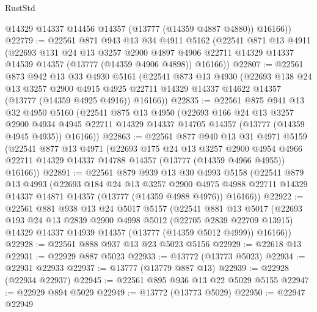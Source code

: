 \begin{lexlean}{RustStd}
\begin{coremodule}
        @14329
        @14337
        @14456
        @14357
        (@13777 (@14359 @4887 @4880))
        @16166))
@22779 := @22561
    @871
    @943
    @13
    @34
    @4911
    @5162
    (@22541
      @871
      @13
      @4911
      (@22693
        @131
        @24
        @13
        @3257
        @2900
        @4897
        @4906
        @22711
        @14329
        @14337
        @14539
        @14357
        (@13777 (@14359 @4906 @4898))
        @16166))
@22807 := @22561
    @873
    @942
    @13
    @33
    @4930
    @5161
    (@22541
      @873
      @13
      @4930
      (@22693
        @138
        @24
        @13
        @3257
        @2900
        @4915
        @4925
        @22711
        @14329
        @14337
        @14622
        @14357
        (@13777 (@14359 @4925 @4916))
        @16166))
@22835 := @22561
    @875
    @941
    @13
    @32
    @4950
    @5160
    (@22541
      @875
      @13
      @4950
      (@22693
        @166
        @24
        @13
        @3257
        @2900
        @4934
        @4945
        @22711
        @14329
        @14337
        @14705
        @14357
        (@13777 (@14359 @4945 @4935))
        @16166))
@22863 := @22561
    @877
    @940
    @13
    @31
    @4971
    @5159
    (@22541
      @877
      @13
      @4971
      (@22693
        @175
        @24
        @13
        @3257
        @2900
        @4954
        @4966
        @22711
        @14329
        @14337
        @14788
        @14357
        (@13777 (@14359 @4966 @4955))
        @16166))
@22891 := @22561
    @879
    @939
    @13
    @30
    @4993
    @5158
    (@22541
      @879
      @13
      @4993
      (@22693
        @184
        @24
        @13
        @3257
        @2900
        @4975
        @4988
        @22711
        @14329
        @14337
        @14871
        @14357
        (@13777 (@14359 @4988 @4976))
        @16166))
@22922 := @22561
    @881
    @938
    @13
    @24
    @5017
    @5157
    (@22541
      @881
      @13
      @5017
      (@22693
        @193
        @24
        @13
        @2839
        @2900
        @4998
        @5012
        (@22705 @2839 @22709 @13915)
        @14329
        @14337
        @14939
        @14357
        (@13777 (@14359 @5012 @4999))
        @16166))
@22928 := @22561 @888 @937 @13 @23 @5023 @5156
@22929 := @22618 @13
@22931 := @22929 @887 @5023
@22933 := @13772 (@13773 @5023)
@22934 := @22931 @22933
@22937 := @13777 (@13779 @887 @13)
@22939 := @22928 (@22934 @22937)
@22945 := @22561 @895 @936 @13 @22 @5029 @5155
@22947 := @22929 @894 @5029
@22949 := @13772 (@13773 @5029)
@22950 := @22947 @22949

\end{coremodule}
\end{lexlean}
